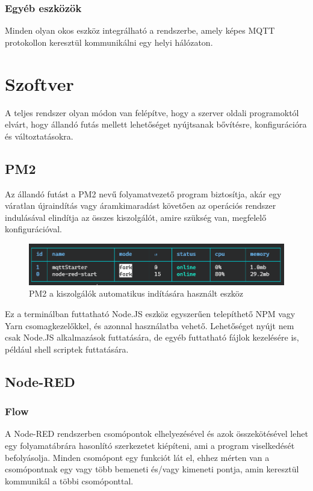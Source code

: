\documentclass[
]{thesis-ekf}
\theoremstyle{definition}
\theoremstyle{remark}
\begin{document}
\subsection{Egyéb eszközök}
Minden olyan okos eszköz integrálható a rendszerbe, amely képes MQTT protokollon keresztül kommunikálni egy helyi hálózaton.

\chapter{Szoftver}
A teljes rendszer olyan módon van felépítve, hogy a szerver oldali programoktól elvárt, hogy állandó futás mellett lehetőséget 
nyújtsanak bővítésre, konfigurációra és változtatásokra. 
\section{PM2}
Az állandó futást a PM2\cite{pm2} nevű folyamatvezető program biztosítja, akár egy váratlan újraindítás
 vagy áramkimaradást követően az operációs rendszer indulásával elindítja az összes kiszolgálót, amire szükség van,
 megfelelő konfigurációval.

\begin{figure}[h]
	\includegraphics[width=1\textwidth]{images/pm2.png}
	\caption{PM2\cite{pm2} a kiszolgálók automatikus indítására használt eszköz}
\end{figure}

Ez a terminálban futtatható Node.JS eszköz egyszerűen telepíthető NPM vagy Yarn csomagkezelőkkel,
 és azonnal használatba vehető. Lehetőséget nyújt nem csak Node.JS alkalmazások futtatására, 
 de egyéb futtatható fájlok kezelésére is, például shell scriptek futtatására.

\section{Node-RED}
\subsection{Flow}
A Node-RED rendszerben csomópontok elhelyezésével és azok összekötésével lehet egy folyamatábrára hasonlító 
szerkezetet kiépíteni, ami a program viselkedését befolyásolja. Minden csomópont egy funkciót lát el, 
ehhez mérten van a csomópontnak  egy vagy több bemeneti és/vagy kimeneti pontja, 
amin keresztül kommunikál a többi csomóponttal.
\end{document}

